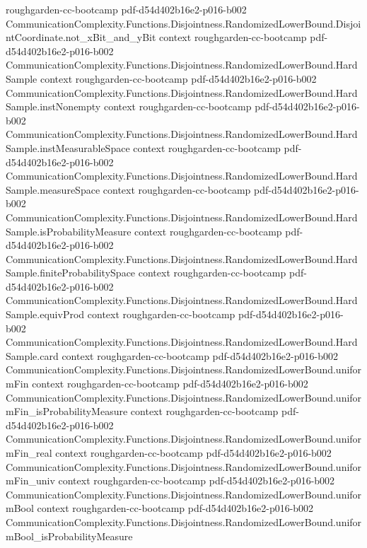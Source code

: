 \begin{theorem}
  {roughgarden-cc-bootcamp}
  {pdf-d54d402b16e2-p016-b002}
\proofstep
  {CommunicationComplexity.Functions.Disjointness.RandomizedLowerBound.DisjointCoordinate.not_xBit_and_yBit}
  {context}
  {roughgarden-cc-bootcamp}
  {pdf-d54d402b16e2-p016-b002}
\proofstep
  {CommunicationComplexity.Functions.Disjointness.RandomizedLowerBound.HardSample}
  {context}
  {roughgarden-cc-bootcamp}
  {pdf-d54d402b16e2-p016-b002}
\proofstep
  {CommunicationComplexity.Functions.Disjointness.RandomizedLowerBound.HardSample.instNonempty}
  {context}
  {roughgarden-cc-bootcamp}
  {pdf-d54d402b16e2-p016-b002}
\proofstep
  {CommunicationComplexity.Functions.Disjointness.RandomizedLowerBound.HardSample.instMeasurableSpace}
  {context}
  {roughgarden-cc-bootcamp}
  {pdf-d54d402b16e2-p016-b002}
\proofstep
  {CommunicationComplexity.Functions.Disjointness.RandomizedLowerBound.HardSample.measureSpace}
  {context}
  {roughgarden-cc-bootcamp}
  {pdf-d54d402b16e2-p016-b002}
\proofstep
  {CommunicationComplexity.Functions.Disjointness.RandomizedLowerBound.HardSample.isProbabilityMeasure}
  {context}
  {roughgarden-cc-bootcamp}
  {pdf-d54d402b16e2-p016-b002}
\proofstep
  {CommunicationComplexity.Functions.Disjointness.RandomizedLowerBound.HardSample.finiteProbabilitySpace}
  {context}
  {roughgarden-cc-bootcamp}
  {pdf-d54d402b16e2-p016-b002}
\proofstep
  {CommunicationComplexity.Functions.Disjointness.RandomizedLowerBound.HardSample.equivProd}
  {context}
  {roughgarden-cc-bootcamp}
  {pdf-d54d402b16e2-p016-b002}
\proofstep
  {CommunicationComplexity.Functions.Disjointness.RandomizedLowerBound.HardSample.card}
  {context}
  {roughgarden-cc-bootcamp}
  {pdf-d54d402b16e2-p016-b002}
\proofstep
  {CommunicationComplexity.Functions.Disjointness.RandomizedLowerBound.uniformFin}
  {context}
  {roughgarden-cc-bootcamp}
  {pdf-d54d402b16e2-p016-b002}
\proofstep
  {CommunicationComplexity.Functions.Disjointness.RandomizedLowerBound.uniformFin_isProbabilityMeasure}
  {context}
  {roughgarden-cc-bootcamp}
  {pdf-d54d402b16e2-p016-b002}
\proofstep
  {CommunicationComplexity.Functions.Disjointness.RandomizedLowerBound.uniformFin_real}
  {context}
  {roughgarden-cc-bootcamp}
  {pdf-d54d402b16e2-p016-b002}
\proofstep
  {CommunicationComplexity.Functions.Disjointness.RandomizedLowerBound.uniformFin_univ}
  {context}
  {roughgarden-cc-bootcamp}
  {pdf-d54d402b16e2-p016-b002}
\proofstep
  {CommunicationComplexity.Functions.Disjointness.RandomizedLowerBound.uniformBool}
  {context}
  {roughgarden-cc-bootcamp}
  {pdf-d54d402b16e2-p016-b002}
\proofstep
  {CommunicationComplexity.Functions.Disjointness.RandomizedLowerBound.uniformBool_isProbabilityMeasure}

\end{theorem}
